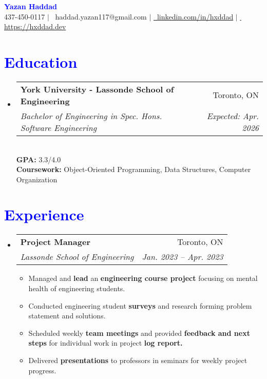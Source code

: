 \documentclass[11pt]{extreport}
\makeatletter
\newcommand{\resumeItem}[1]{
  \item\small{
    {#1 \vspace{-2pt}}
  }
}
\newcommand{\resumeSubheading}[4]{
  \vspace{-2pt}\item
    \begin{tabular*}{0.97\textwidth}[t]{l@{\extracolsep{\fill}}r}
      \textbf{#1} & #2 \\
      \textit{\small#3} & \textit{\small #4} \\  
    \end{tabular*}\vspace{-7pt}
}
\newcommand{\resumeSubHeadingListStart}{\begin{itemize}[leftmargin=0.15in, label={}]}
\newcommand{\resumeSubHeadingListEnd}{\end{itemize}}
\newcommand{\resumeItemListStart}{\begin{itemize}}
\newcommand{\resumeItemListEnd}{\end{itemize}\vspace{-5pt}}
\makeatother
\begin{document}
\begin{center}
    \textbf{\huge \textcolor{blue}{Yazan Haddad}} \\ \vspace{8pt}
    \small \raisebox{-0.25ex}{\faPhone} 437-450-0117 $|$ {{\faEnvelope \, haddad.yazan117@gmail.com}} $|$ 
\href{https://www.linkedin.com/in/hxddad}{\faLinkedin \, linkedin.com/in/hxddad} $|$ \href{https://hxddad.dev}{\faGlobe \, https://hxddad.dev}
\end{center}

\section{\textcolor{blue}{Education}}
  \resumeSubHeadingListStart
    \resumeSubheading
      {York University - Lassonde School of Engineering}{Toronto, ON}
      {Bachelor of Engineering in Spec. Hons. Software Engineering}{Expected: Apr. 2026} 
      \vspace{10pt}\\
      \textbf{GPA:} 3.3/4.0 \\
      \textbf{Coursework:} Object-Oriented Programming, Data Structures, Computer Organization
  \resumeSubHeadingListEnd

\section{\textcolor{blue}{Experience}}
    \resumeSubHeadingListStart
        \resumeSubheading
            {Project Manager}{Toronto, ON}
            {Lassonde School of Engineering}{Jan. 2023 -- Apr. 2023}
            \resumeItemListStart
                \resumeItem{Managed and \textbf{lead} an \textbf{engineering course project} focusing on mental health of engineering students.}
                \resumeItem{Conducted engineering student \textbf{surveys} and research forming problem statement and solutions.}
                \resumeItem{Scheduled weekly \textbf{team meetings} and provided \textbf{feedback and next steps} for individual work in project \textbf{log report.}}
                \resumeItem{Delivered \textbf{presentations} to professors in seminars for weekly project progress.}
            \resumeItemListEnd
    \resumeSubHeadingListEnd

\end{document}
